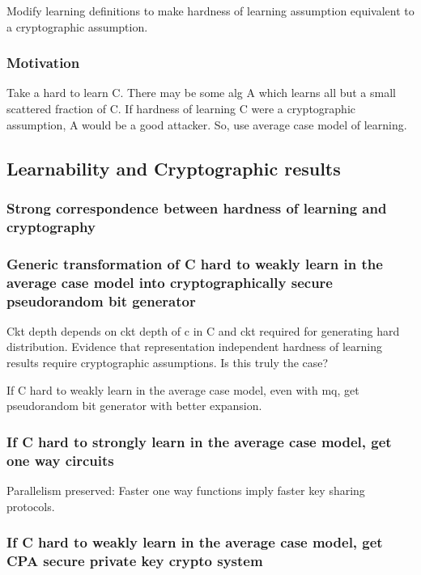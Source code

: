 \documentclass[10pt]{amsart}
\begin{document}
Modify learning definitions to make hardness of learning assumption equivalent to a cryptographic assumption.

\subsubsection{Motivation}
Take a hard to learn C. There may be some alg A which learns all but a small scattered fraction of C. If hardness of learning C were a cryptographic assumption, A would be a good attacker. So, use average case model of learning.

\subsection{Learnability and Cryptographic results}

\subsubsection{Strong correspondence between hardness of learning and cryptography}

\subsubsection{Generic transformation of C hard to weakly learn in the average case model into cryptographically secure pseudorandom bit generator}

Ckt depth depends on ckt depth of c in C and ckt required for generating hard distribution.
Evidence that representation independent hardness of learning results require cryptographic assumptions. Is this truly the case?

If C hard to weakly learn in the average case model, even with mq, get pseudorandom bit generator with better expansion.

\subsubsection{If C hard to strongly learn in the average case model, get one way circuits}

Parallelism preserved: Faster one way functions imply faster key sharing protocols.

\subsubsection{If C hard to weakly learn in the average case model, get CPA secure private key crypto system}
\end{document}
